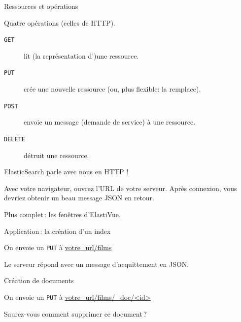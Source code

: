 \begin{frame}{Ressources et opérations}



\vfill

Quatre opérations (celles de HTTP).
\begin{description}
  \item[\texttt{GET}] \alert{lit} (la représentation d')une ressource.
  \item[\texttt{PUT}] \alert{crée} une nouvelle ressource (ou, plus flexible: la remplace).
  \item[\texttt{POST}] envoie un message (\alert{demande de service}) à une ressource.
  \item[\texttt{DELETE}] \alert{détruit} une ressource.
\end{description}
 
\end{frame}



\begin{frame}[fragile]{ElasticSearch parle avec nous en HTTP !}

Avec votre navigateur, ouvrez l'URL de votre serveur.
Après connexion, vous devriez obtenir un beau message 
JSON en retour.

\vfill 
\centerline{}

\vfill 
Plus complet\,: les fenêtres d'ElastiVue.

\end{frame}


\begin{frame}{Application\,: la création d'un index}

On envoie un \texttt{PUT} à \url{votre_url/films}

\vfill 

\centerline{}

\vfill

Le serveur répond avec un message d'acquittement en JSON.

\end{frame}



\begin{frame}{Création de documents}

On envoie un \texttt{PUT} à \url{votre_url/films/_doc/<id>}

\vfill 

\centerline{}

\vfill

Saurez-vous comment supprimer ce document\,?

\end{frame}


